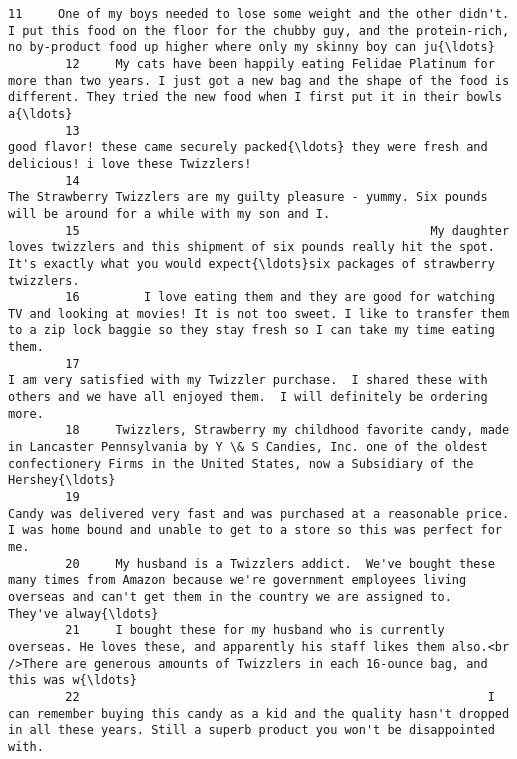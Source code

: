\documentclass[11pt]{article}
\begin{document}
\begin{Verbatim}[commandchars=\\\{\}]
        11     One of my boys needed to lose some weight and the other didn't.  I put this food on the floor for the chubby guy, and the protein-rich, no by-product food up higher where only my skinny boy can ju{\ldots}  
        12     My cats have been happily eating Felidae Platinum for more than two years. I just got a new bag and the shape of the food is different. They tried the new food when I first put it in their bowls a{\ldots}  
        13                                                                                                           good flavor! these came securely packed{\ldots} they were fresh and delicious! i love these Twizzlers!  
        14                                                                                           The Strawberry Twizzlers are my guilty pleasure - yummy. Six pounds will be around for a while with my son and I.  
        15                                                 My daughter loves twizzlers and this shipment of six pounds really hit the spot. It's exactly what you would expect{\ldots}six packages of strawberry twizzlers.  
        16         I love eating them and they are good for watching TV and looking at movies! It is not too sweet. I like to transfer them to a zip lock baggie so they stay fresh so I can take my time eating them.  
        17                                                               I am very satisfied with my Twizzler purchase.  I shared these with others and we have all enjoyed them.  I will definitely be ordering more.  
        18     Twizzlers, Strawberry my childhood favorite candy, made in Lancaster Pennsylvania by Y \& S Candies, Inc. one of the oldest confectionery Firms in the United States, now a Subsidiary of the Hershey{\ldots}  
        19                                                           Candy was delivered very fast and was purchased at a reasonable price.  I was home bound and unable to get to a store so this was perfect for me.  
        20     My husband is a Twizzlers addict.  We've bought these many times from Amazon because we're government employees living overseas and can't get them in the country we are assigned to.  They've alway{\ldots}  
        21     I bought these for my husband who is currently overseas. He loves these, and apparently his staff likes them also.<br />There are generous amounts of Twizzlers in each 16-ounce bag, and this was w{\ldots}  
        22                                                         I can remember buying this candy as a kid and the quality hasn't dropped in all these years. Still a superb product you won't be disappointed with.  

\end{Verbatim}
\end{document}
